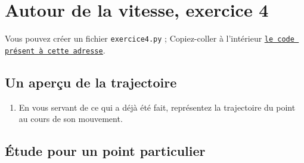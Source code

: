 \documentclass[11pt]{article}
\begin{document}
\section{Autour de la vitesse, exercice 4}





\bigskip



Vous pouvez créer un fichier \texttt{exercice4.py} ; Copiez-coller à l'intérieur \href{https://github.com/formationPythonPC-Juin/aides-formation/blob/master/exercice4-aide.py}{\underline{\texttt{le code présent à cette adresse}}}. 



\subsection{Un aperçu de la trajectoire}

\begin{enumerate}
 \item En vous servant de ce qui a déjà été fait, représentez la trajectoire du point au cours de son mouvement.

\end{enumerate}




\subsection{Étude pour un point particulier}
\end{document}
